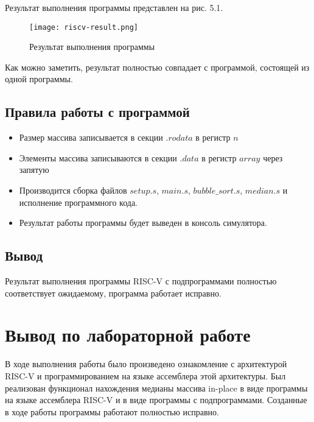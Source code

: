 Результат выполнения программы представлен на рис. 5.1.

\begin{figure}[H]
	\centering
	\texttt{[image: riscv-result.png]}
	\caption{Результат выполнения программы}
\end{figure}

Как можно заметить, результат полностью совпадает с программой, состоящей из одной программы.

\subsection{Правила работы с программой}
\begin{itemize}
	\item Размер массива записывается в секции \(.rodata\) в регистр \(n\)
	\item Элементы массива записываются в секции \(.data\) в регистр \(array\) через запятую
	\item Производится сборка файлов \(setup.s\), \(main.s\), \(bubble\_sort.s\), \(median.s\) и исполнение программного кода.
	\item Результат работы программы будет выведен в консоль симулятора.
\end{itemize}

\subsection{Вывод}
Результат выполнения программы RISC-V с подпрограммами полностью соответствует ожидаемому, программа работает исправно.

\section{Вывод по лабораторной работе}
В ходе выполнения работы было произведено ознакомление с архитектурой RISC-V и программированием на языке ассемблера этой архитектуры. Был реализован функционал нахождения медианы массива in-place в виде программы на языке ассемблера RISC-V и в виде программы с подпрограммами. Созданные в ходе работы программы работают полностью исправно.